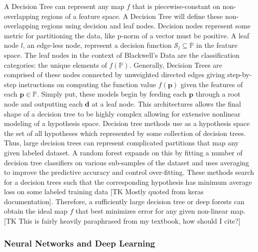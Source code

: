 \documentclass{article}
\theoremstyle{definition}
\begin{document}
A Decision Tree can represent any map $f$ that is piecewise-constant on non-overlapping
regions of a feature space. A Decision Tree will define these non-overlapping regions using decision and leaf nodes.  Decision nodes represent some metric for partitioning the data, like p-norm of a vector must be positive.  A leaf node $l$, an edge-less node, represent a decision function $\mathcal{S}_l \subseteq \mathbb{P}$ in the feature space. The leaf nodes in the context of Blackwell's Data are the classification categories: the unique elements of $f(\mathbb{P})$.  Generally, Decision Trees are comprised of these nodes connected by unweighted directed edges giving step-by-step instructions on computing the function value $f(\boldsymbol{p})$ given the features of each $\boldsymbol{p}\in \mathbb{P}$.  Simply put, these models begin by feeding each $\boldsymbol{p}$ through a root node and outputting each $\boldsymbol{d}$ at a leaf node.  This architectures allows the final shape of a decision tree to be highly complex allowing for extensive nonlinear modeling of a hypothesis space.  Decision tree methods use as a hypothesis space the set of all hypotheses which represented by some collection of decision trees.  Thus, large decision trees can represent complicated partitions that map any given labeled dataset.  A random forest expands on this by fitting a number of decision tree classifiers on various sub-samples of the dataset and uses averaging to improve the predictive accuracy and control over-fitting. These methods search for a decision trees such that the corresponding hypothesis has minimum average loss on some labeled training data [TK Mostly quoted from keras documentation].  Therefore, a sufficiently large decision tree or deep forests can obtain the ideal map $f$ that best minimizes error for any given non-linear map.  [TK This is fairly heavily paraphrased from my textbook, how should I cite?]






\subsubsection{Neural Networks and Deep Learning}
\end{document}

